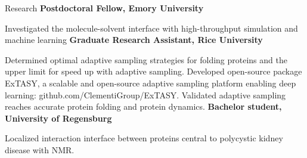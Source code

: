 \begin{rubric}{Research}
\entry*[2020 -- present]%
	\textbf{Postdoctoral Fellow, Emory University}
  \par Investigated the molecule-solvent interface with high-throughput simulation and machine learning 
\entry*[2014 -- 2020]%
  \textbf{Graduate Research Assistant, Rice University}
  \par Determined optimal adaptive sampling strategies for folding proteins and the upper limit for speed up with adaptive sampling. Developed open-source package ExTASY, a scalable and open-source adaptive sampling platform enabling deep learning: github.com/ClementiGroup/ExTASY. Validated adaptive sampling reaches accurate protein folding and protein dynamics.
\entry*[2012]%
  \textbf{Bachelor student, University of Regensburg}
  \par Localized interaction interface between proteins central to polycystic kidney disease with NMR.
\end{rubric}
